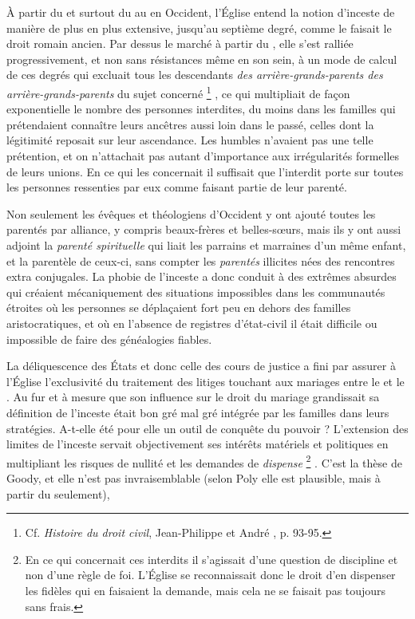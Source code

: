  À partir du  et surtout du  au  en Occident, l'Église entend la notion d'inceste de manière de plus en plus extensive, jusqu'au septième degré, comme le faisait le droit romain ancien. Par dessus le marché à partir du , elle s'est ralliée progressivement, et non sans résistances même en son sein, à un mode de calcul de ces degrés qui excluait tous les descendants \emph{des arrière-grands-parents des arrière-grands-parents} du sujet concerné%
\footnote{Cf. \emph{Histoire du droit civil}, Jean-Philippe  et André , p. 93-95.}%
, ce qui multipliait de façon exponentielle le nombre des personnes interdites, du moins dans les familles qui prétendaient connaître leurs ancêtres aussi loin dans le passé, celles dont la légitimité reposait sur leur ascendance. Les humbles n'avaient pas une telle prétention, et on n'attachait pas autant d'importance aux irrégularités formelles de leurs unions. En ce qui les concernait il suffisait que l'interdit porte sur toutes les personnes ressenties par eux comme faisant partie de leur parenté. 

 Non seulement les évêques et théologiens d'Occident y ont ajouté toutes les parentés par alliance, y compris beaux-frères et belles-sœurs, mais ils y ont aussi adjoint la \emph{parenté spirituelle} qui liait les parrains et marraines d'un même enfant, et la parentèle de ceux-ci, sans compter les \emph{parentés} illicites nées des rencontres extra conjugales. La phobie de l'inceste a donc conduit à des extrêmes absurdes qui créaient mécaniquement des situations impossibles dans les communautés étroites où les personnes se déplaçaient fort peu en dehors des familles aristocratiques, et où en l'absence de registres d'état-civil il était difficile ou impossible de faire des généalogies fiables. 

 La déliquescence des États et donc celle des cours de justice a fini par assurer à l'Église l'exclusivité du traitement des litiges touchant aux mariages entre le  et le . Au fur et à mesure que son influence sur le droit du mariage grandissait sa définition de l'inceste était bon gré mal gré intégrée par les familles dans leurs stratégies. A-t-elle été pour elle un outil de conquête du pouvoir ? L'extension des limites de l'inceste servait objectivement ses intérêts matériels et politiques en multipliant les risques de nullité et les demandes de \emph{dispense}%
\footnote{En ce qui concernait ces interdits il s'agissait d'une question de discipline et non d'une règle de foi. L'Église se reconnaissait donc le droit d'en dispenser les fidèles qui en faisaient la demande, mais cela ne se faisait pas toujours sans frais.}%
. C'est la thèse de Goody, et elle n'est pas invraisemblable (selon Poly elle est plausible, mais à partir du  seulement),

